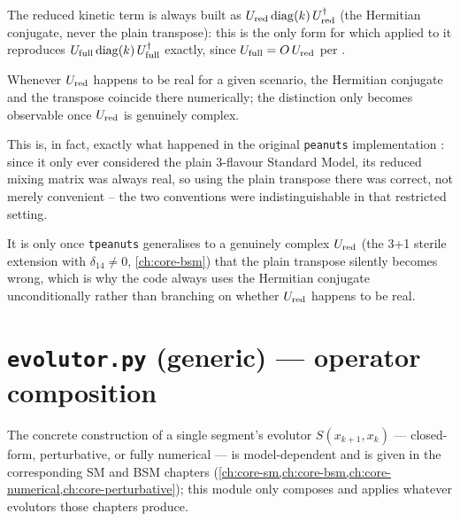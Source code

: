 \begin{notebox}[title={Hermitian Conjugate vs. Plain Transpose}]
The reduced kinetic term is always built as $U_{\rm red}\operatorname{diag}(k)\,U_{\rm
red}^\dagger$ (the Hermitian conjugate, never the plain transpose): this is
the only form for which  applied to it
reproduces $U_{\rm full}\operatorname{diag}(k)\,U_{\rm full}^\dagger$ exactly, since
$U_{\rm full}=O\,U_{\rm red}$ per .

Whenever
$U_{\rm red}$ happens to be real for a given scenario, the Hermitian
conjugate and the transpose coincide there numerically; the distinction
only becomes observable once $U_{\rm red}$ is genuinely complex. 

This is,
in fact, exactly what happened in the original \texttt{peanuts}
implementation \parencite{LucentePeanuts}: since it only ever considered
the plain 3-flavour Standard Model, its reduced mixing matrix was always
real, so using the plain transpose there was correct, not merely
convenient -- the two conventions were indistinguishable in that restricted
setting. 

It is only once \texttt{tpeanuts} generalises to a genuinely 
complex $U_{\rm red}$ (the 3+1 sterile extension with $\delta_{14}\neq0$,
\cref{ch:core-bsm}) that the plain transpose silently becomes wrong, which
is why the code always uses the Hermitian conjugate unconditionally rather
than branching on whether $U_{\rm red}$ happens to be real.
\end{notebox}

\section{\texttt{evolutor.py} (generic) --- operator composition}


The concrete construction of a single segment's evolutor $S(x_{k+1},x_k)$
--- closed-form, perturbative, or fully numerical --- is model-dependent
and is given in the corresponding SM and BSM chapters
(\cref{ch:core-sm,ch:core-bsm,ch:core-numerical,ch:core-perturbative}); this
module only composes and applies whatever evolutors those chapters produce.

